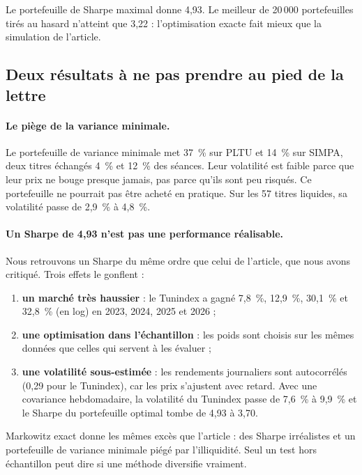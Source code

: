 \documentclass[11pt,a4paper]{article}
\newcommand{\pc}{~\%}
\begin{document}
Le portefeuille de Sharpe maximal donne 4,93. Le meilleur de 20\,000 portefeuilles tirés au hasard n'atteint que 3,22 : l'optimisation exacte fait mieux que la simulation de l'article.

\subsection{Deux résultats à ne pas prendre au pied de la lettre}
\paragraph{Le piège de la variance minimale.} Le portefeuille de variance minimale met 37\pc{} sur PLTU et 14\pc{} sur SIMPA, deux titres échangés 4\pc{} et 12\pc{} des séances. Leur volatilité est faible parce que leur prix ne bouge presque jamais, pas parce qu'ils sont peu risqués. Ce portefeuille ne pourrait pas être acheté en pratique. Sur les 57 titres liquides, sa volatilité passe de 2,9\pc{} à 4,8\pc{}.

\paragraph{Un Sharpe de 4,93 n'est pas une performance réalisable.} Nous retrouvons un Sharpe du même ordre que celui de l'article, que nous avons critiqué. Trois effets le gonflent :
\begin{enumerate}
  \item \textbf{un marché très haussier} : le Tunindex a gagné 7,8\pc{}, 12,9\pc{}, 30,1\pc{} et 32,8\pc{} (en log) en 2023, 2024, 2025 et 2026 ;
  \item \textbf{une optimisation dans l'échantillon} : les poids sont choisis sur les mêmes données que celles qui servent à les évaluer ;
  \item \textbf{une volatilité sous-estimée} : les rendements journaliers sont autocorrélés (0,29 pour le Tunindex), car les prix s'ajustent avec retard. Avec une covariance hebdomadaire, la volatilité du Tunindex passe de 7,6\pc{} à 9,9\pc{} et le Sharpe du portefeuille optimal tombe de 4,93 à 3,70.
\end{enumerate}

\begin{retenir}
Markowitz exact donne les mêmes excès que l'article : des Sharpe irréalistes et un portefeuille de variance minimale piégé par l'illiquidité. Seul un test hors échantillon peut dire si une méthode diversifie vraiment.
\end{retenir}
\end{document}
